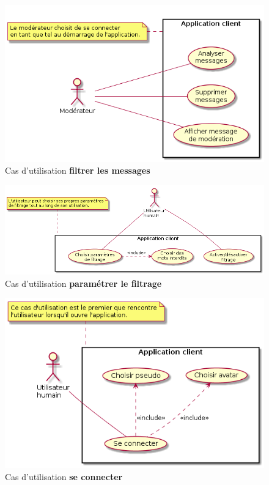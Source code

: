 \documentclass[11pt,dvipsnames,svgnames]{report}
\begin{document}
\begin{center}
\begin{figure}[H]
\caption{Cas d'utilisation \textbf{filtrer les messages}}
\includegraphics[width=\linewidth]{images/uc-filtrerMessages.png}
\end{figure}

\begin{figure}
\caption{Cas d'utilisation \textbf{paramétrer le filtrage}}
\includegraphics[width=\linewidth]{images/uc-parametrerFiltrage.png}
\end{figure}

\begin{figure}
\caption{Cas d'utilisation \textbf{se connecter}}
\includegraphics[width=\linewidth]{images/uc-seConnecter.png}
\end{figure}

\end{center}
\end{document}

